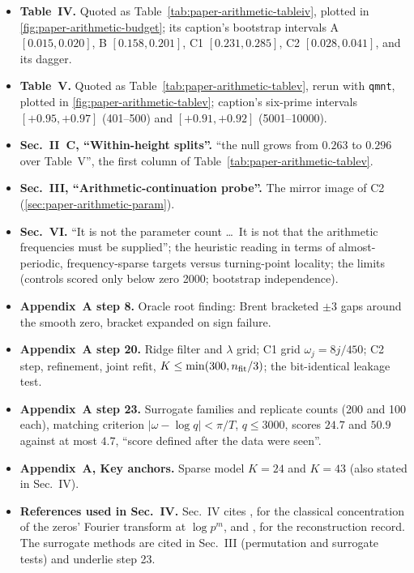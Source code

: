 \begin{itemize}
\item \textbf{Table~IV.} Quoted as Table~\ref{tab:paper-arithmetic-tableiv}, plotted in \cref{fig:paper-arithmetic-budget}; its caption's bootstrap intervals A $[0.015,0.020]$, B $[0.158,0.201]$, C1 $[0.231,0.285]$, C2 $[0.028,0.041]$, and its dagger.
\item \textbf{Table~V.} Quoted as Table~\ref{tab:paper-arithmetic-tablev}, rerun with \texttt{qmnt}, plotted in \cref{fig:paper-arithmetic-tablev}; caption's six-prime intervals $[+0.95,+0.97]$ (401--500) and $[+0.91,+0.92]$ (5001--10000).
\item \textbf{Sec.~II~C, ``Within-height splits''.} ``the null grows from $0.263$ to $0.296$ over Table~V'', the first column of Table~\ref{tab:paper-arithmetic-tablev}.
\item \textbf{Sec.~III, ``Arithmetic-continuation probe''.} The mirror image of C2 (\cref{sec:paper-arithmetic-param}).
\item \textbf{Sec.~VI.} ``It is not the parameter count \dots\ It is not that the arithmetic frequencies must be supplied''; the heuristic reading in terms of almost-periodic, frequency-sparse targets versus turning-point locality; the limits (controls scored only below zero 2000; bootstrap independence).
\item \textbf{Appendix~A step 8.} Oracle root finding: Brent bracketed $\pm3$ gaps around the smooth zero, bracket expanded on sign failure.
\item \textbf{Appendix~A step 20.} Ridge filter and $\lambda$ grid; C1 grid $\omega_j=8j/450$; C2 step, refinement, joint refit, $K\le\min(300,n_{\rm fit}/3)$; the bit-identical leakage test.
\item \textbf{Appendix~A step 23.} Surrogate families and replicate counts (200 and 100 each), matching criterion $|\omega-\log q|<\pi/T$, $q\le3000$, scores $24.7$ and $50.9$ against at most $4.7$, ``score defined after the data were seen''.
\item \textbf{Appendix~A, Key anchors.} Sparse model $K=24$ and $K=43$ (also stated in Sec.~IV).
\item \textbf{References used in Sec.~IV.} Sec.~IV cites \cite{landau,gonek}, for the classical concentration of the zeros' Fourier transform at $\log p^m$, and \cite{zenodo}, for the reconstruction record. The surrogate methods \cite{theiler,schreiber} are cited in Sec.~III (permutation and surrogate tests) and underlie step 23.
\end{itemize}

